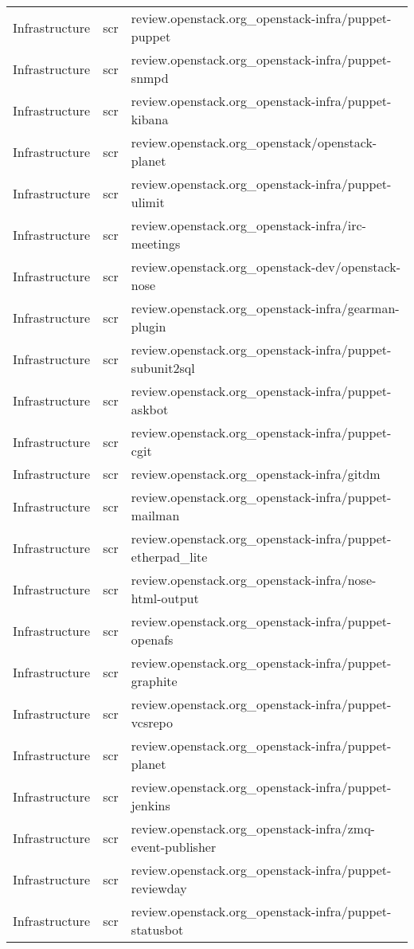 \begin{center}
\begin{longtable}{|p{4cm}|p{1cm}|p{10cm}|}
Infrastructure&scr&review.openstack.org\_openstack-infra/puppet-puppet\\
Infrastructure&scr&review.openstack.org\_openstack-infra/puppet-snmpd\\
Infrastructure&scr&review.openstack.org\_openstack-infra/puppet-kibana\\
Infrastructure&scr&review.openstack.org\_openstack/openstack-planet\\
Infrastructure&scr&review.openstack.org\_openstack-infra/puppet-ulimit\\
Infrastructure&scr&review.openstack.org\_openstack-infra/irc-meetings\\
Infrastructure&scr&review.openstack.org\_openstack-dev/openstack-nose\\
Infrastructure&scr&review.openstack.org\_openstack-infra/gearman-plugin\\
Infrastructure&scr&review.openstack.org\_openstack-infra/puppet-subunit2sql\\
Infrastructure&scr&review.openstack.org\_openstack-infra/puppet-askbot\\
Infrastructure&scr&review.openstack.org\_openstack-infra/puppet-cgit\\
Infrastructure&scr&review.openstack.org\_openstack-infra/gitdm\\
Infrastructure&scr&review.openstack.org\_openstack-infra/puppet-mailman\\
Infrastructure&scr&review.openstack.org\_openstack-infra/puppet-etherpad\_lite\\
Infrastructure&scr&review.openstack.org\_openstack-infra/nose-html-output\\
Infrastructure&scr&review.openstack.org\_openstack-infra/puppet-openafs\\
Infrastructure&scr&review.openstack.org\_openstack-infra/puppet-graphite\\
Infrastructure&scr&review.openstack.org\_openstack-infra/puppet-vcsrepo\\
Infrastructure&scr&review.openstack.org\_openstack-infra/puppet-planet\\
Infrastructure&scr&review.openstack.org\_openstack-infra/puppet-jenkins\\
Infrastructure&scr&review.openstack.org\_openstack-infra/zmq-event-publisher\\
Infrastructure&scr&review.openstack.org\_openstack-infra/puppet-reviewday\\
Infrastructure&scr&review.openstack.org\_openstack-infra/puppet-statusbot\\

\end{longtable}
\end{center}
